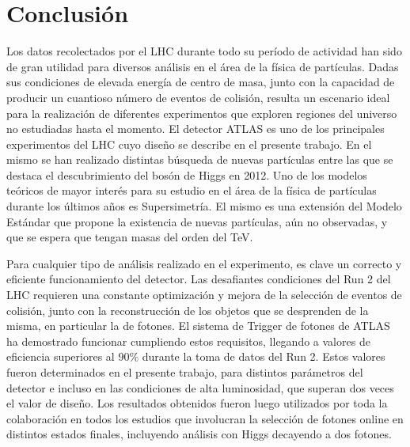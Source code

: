 \chapter{Conclusión}

Los datos recolectados por el LHC durante todo su período de actividad han sido de gran utilidad para diversos análisis en el área de la física de partículas. Dadas sus condiciones de elevada energía de centro de masa, junto con la capacidad de producir un cuantioso número de eventos de colisión, resulta un escenario ideal para la realización de diferentes experimentos que exploren regiones del universo no estudiadas hasta el momento. El detector ATLAS es uno de los principales experimentos del LHC cuyo diseño se describe en el presente trabajo. En el mismo se han realizado distintas búsqueda de nuevas partículas entre las que se destaca el descubrimiento del bosón de Higgs en 2012. Uno de los modelos teóricos de mayor interés para su estudio en el área de la física de partículas durante los últimos años es Supersimetría. El mismo es una extensión del Modelo Estándar que propone la existencia de nuevas partículas, aún no observadas, y que se espera que tengan masas del orden del TeV. 


Para cualquier tipo de análisis realizado en el experimento, es clave un correcto y eficiente funcionamiento del detector. Las desafiantes condiciones del Run 2 del LHC requieren una constante optimización y mejora de la selección de eventos de colisión, junto con la reconstrucción de los objetos que se desprenden de la misma, en particular la de fotones.
El sistema de Trigger de fotones de ATLAS ha demostrado funcionar cumpliendo estos requisitos, llegando a valores de eficiencia superiores al $90\%$ durante la toma de datos del Run 2. Estos valores fueron determinados en el presente trabajo, para distintos parámetros del detector e incluso en las condiciones de alta luminosidad, que superan dos veces el valor de diseño. Los resultados obtenidos fueron luego utilizados por toda la colaboración en todos los estudios que involucran la selección de fotones online en distintos estados finales, incluyendo análisis con Higgs decayendo a dos fotones. 

